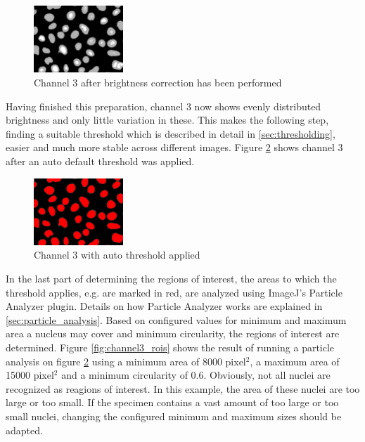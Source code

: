 \documentclass[a4paper, 12pt, twoside]{article}
\begin{document}
\begin{figure}
\vspace{-14pt}
\includegraphics[width=0.3\textwidth]{images/example_Kanal3_multiply178_gaussian2}
\caption{Channel 3 after brightness correction has been performed}
\label{fig:example_channel3_prepared}
\end{figure}

Having finished this preparation, channel 3 now shows evenly distributed
brightness and only little variation in these. This makes the following step,
finding a suitable threshold which is described in detail in
\ref{sec:thresholding}, easier and much more stable across different images.
Figure \ref{fig:channel3_threshold} shows channel 3 after an auto
default threshold was applied.

\begin{figure}
\vspace{-14pt}
\includegraphics[width=0.3\textwidth]{images/example_Kanal3_corrected_threshold}
\caption{Channel 3 with auto threshold applied}
\label{fig:channel3_threshold}
\end{figure}

In the last part of determining the regions of interest, the areas to which the
threshold applies, e.g. are marked in red, are analyzed using ImageJ's
Particle Analyzer plugin. Details on how Particle Analyzer works are explained
in \ref{sec:particle_analysis}. Based on configured values for minimum and
maximum area a nucleus may cover and minimum circularity, the regions of
interest are determined. Figure \ref{fig:channel3_rois} shows the result of
running a particle analysis on figure \ref{fig:channel3_threshold} using a
minimum area of 8000 pixel$^2$, a maximum area of 15000 pixel$^2$ and a minimum
circularity of 0.6. Obviously, not all nuclei are recognized as reagions of
interest. In this example, the area of these nuclei are too large or too small.
If the specimen contains a vast amount of too large or too small nuclei,
changing the configured minimum and maximum sizes should be adapted. 
\end{document}
